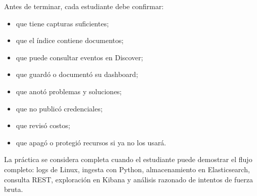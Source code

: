 \documentclass[
  coursetitle={Cómputo Nube y Tecnologías Emergentes},
  coursehours={96},
  coursedate={Verano 2026},
  doctype={Práctica},
  otherlangs={english,french},
  authorname={Lázaro},
  authorsurname={Bustio-Martínez},
  authortitle={PhD},
  role={Profesor Investigador},
  email={lbustio@inaoe.mx},
  phone={5559504000},
  ext={7459},
  institution={Instituto Nacional de Astrofísica, Óptica y Electrónica (INAOE)},
  department={Maestría en Ciencias en Tecnologías de Seguridad},
  address={Luis Enrique Erro 1, Sta. Ma. Tonantzintla, San Andrés Cholula, CP 72840, Puebla, México},
  margin={0.5in}
]{../../lbustio_lecture_notes}
\begin{document}
Antes de terminar, cada estudiante debe confirmar:

\begin{itemize}
    \item que tiene capturas suficientes;
    \item que el índice contiene documentos;
    \item que puede consultar eventos en Discover;
    \item que guardó o documentó su dashboard;
    \item que anotó problemas y soluciones;
    \item que no publicó credenciales;
    \item que revisó costos;
    \item que apagó o protegió recursos si ya no los usará.
\end{itemize}

La práctica se considera completa cuando el estudiante puede demostrar el flujo completo: logs de Linux, ingesta con Python, almacenamiento en Elasticsearch, consulta REST, exploración en Kibana y análisis razonado de intentos de fuerza bruta.
\end{document}
